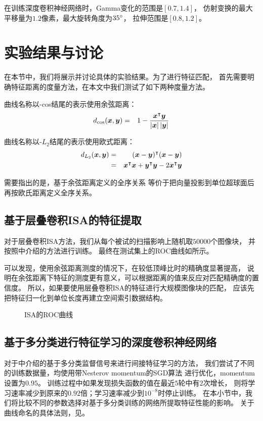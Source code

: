 在训练深度卷积神经网络时，Gamma变化的范围是$[0.7, 1.4]$，
仿射变换的最大平移量为$1.2$像素，最大旋转角度为$35\degree$，
拉伸范围是$[0.8, 1.2]$。


\section{实验结果与讨论}
在本节中，我们将展示并讨论具体的实验结果。为了进行特征匹配，
首先需要明确特征距离的度量方法，在本文中我们测试了如下两种度量方法。

曲线名称以-cos结尾的表示使用余弦距离：
\begin{eqnarray}
    d_{\cos}(\boldsymbol{x}, \boldsymbol{y}) &=& 1 -
        \frac{\boldsymbol{x}^\intercal\boldsymbol{y}}{\left|\boldsymbol{x}\right|\left|\boldsymbol{y}\right|}
\end{eqnarray}

曲线名称以-$L_2$结尾的表示使用欧式距离：
\begin{eqnarray}
    d_{L_2}(\boldsymbol{x}, \boldsymbol{y}) &=&
        (\boldsymbol{x}-\boldsymbol{y})^\intercal(\boldsymbol{x}-\boldsymbol{y}) \nonumber \\
        &=& \boldsymbol{x}^\intercal\boldsymbol{x} + \boldsymbol{y}^\intercal\boldsymbol{y} -
        2\boldsymbol{x}^\intercal\boldsymbol{y}
\end{eqnarray}

需要指出的是，基于余弦距离定义的全序关系
等价于把向量投影到单位超球面后再按欧氏距离定义全序关系。

\subsection{基于层叠卷积ISA的特征提取\label{sec:expr:isa}}
对于层叠卷积ISA方法，我们从每个被试的扫描影响上随机取$50000$个图像块，
并按照中介绍的方法进行训练。
最终在测试集上的ROC曲线如所示。

可以发现，使用余弦距离测度的情况下，在较低顶峰比时的精确度显著提高，
说明在余弦距离下特征的测度更有意义，可以根据距离的值来反应对匹配精确度的置信度。
所以，如果要使用层叠卷积ISA的特征进行大规模图像块的匹配，
应该先把特征归一化到单位长度再建立空间索引数据结构。

\begin{figure}[h!]
    \caption{ISA的ROC曲线}
    \label{fig:expr:curve:ISA}
\end{figure}

\subsection{基于多分类进行特征学习的深度卷积神经网络\label{sec:expr:clsfy}}
对于中介绍的基于多分类监督信号来进行间接特征学习的方法，
我们尝试了不同的训练数据量，均使用带Nesterov momentum的SGD算法
\cite{sutskever2013importance}进行优化，momentum设置为$0.95$。
训练过程中如果发现损失函数的值在最近$5$轮中有$2$次增长，
则将学习速率减少到原来的$0.92$倍；学习速率减少到$10^{-8}$时停止训练。
在本小节中，我们将比较不同的参数选择对基于多分类训练的网络所提取特征性能的影响。
关于曲线命名的具体法则，见。

